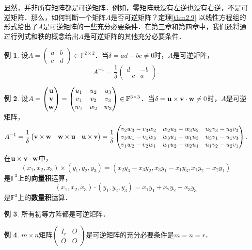 \documentclass[a4paper,fontset=windows]{ctexbook}
\theoremstyle{definition}
\newtheorem{example}{例}[chapter]
\begin{document}
显然，并非所有矩阵都是可逆矩阵．例如，零矩阵既没有左逆也没有右逆，不是可逆矩阵．那么，如何判断一个矩阵$A$是否可逆矩阵？定理\ref{thm2.9} 以线性方程组的形式给出了$A$是可逆矩阵的一些充分必要条件．在第三章和第四章中，我们还将通过行列式和秩的概念给出$A$是可逆矩阵的其他充分必要条件．

\begin{example}
设$A=\begin{pmatrix}a&b \\ c&d\end{pmatrix}\in\mathbb{F}^{2\times 2}$．当$\delta=ad-bc\ne 0$时，$A$是可逆矩阵，
$$A^{-1}=\frac{1}{\delta}\begin{pmatrix}d&-b \\ -c&a\end{pmatrix}.$$
\end{example}

\begin{example}
设$A=\begin{pmatrix}{\bf u} \\ {\bf v} \\ {\bf w}\end{pmatrix}=\begin{pmatrix}u_1&u_2&u_3 \\ v_1&v_2&v_3 \\ w_1&w_2&w_3\end{pmatrix}\in\mathbb{F}^{3\times 3}$．当$\delta={\bf u\times v\cdot w}\ne 0$时，$A$是可逆矩阵，
$$A^{-1}=\frac{1}{\delta}\begin{pmatrix}{\bf v\times w} & {\bf w\times u} & {\bf u\times v}\end{pmatrix}=\frac{1}{\delta}\begin{pmatrix}v_2w_3-v_3w_2&w_2u_3-w_3u_2&u_2v_3-u_3v_2 \\ v_3w_1-v_1w_3&w_3u_1-w_1u_3&u_3v_1-u_1v_3 \\ v_1w_2-v_2w_1&w_1u_2-w_2u_1&u_1v_2-u_2v_1\end{pmatrix}.$$
在${\bf u\times v\cdot w}$中，
$$(x_1,x_2,x_3)\times(y_1,y_2,y_3)=(x_2y_3-x_3y_2,x_3y_1-x_1y_3,x_1y_2-x_2y_1)$$
是$\mathbb{F}^3$上的{\bf 向量积}运算，
$$(x_1,x_2,x_3)\cdot(y_1,y_2,y_3)=x_1y_1+x_2y_2+x_3y_3$$
是$\mathbb{F}^3$上的{\bf 数量积}运算．
\end{example}

\begin{example}\label{ex2.15}
所有初等方阵都是可逆矩阵．
\end{example}

\begin{example}\label{ex2.16}
$m\times n$矩阵$\begin{pmatrix}I_r&O \\ O&O\end{pmatrix}$是可逆矩阵的充分必要条件是$m=n=r$．
\end{example}
\end{document}

